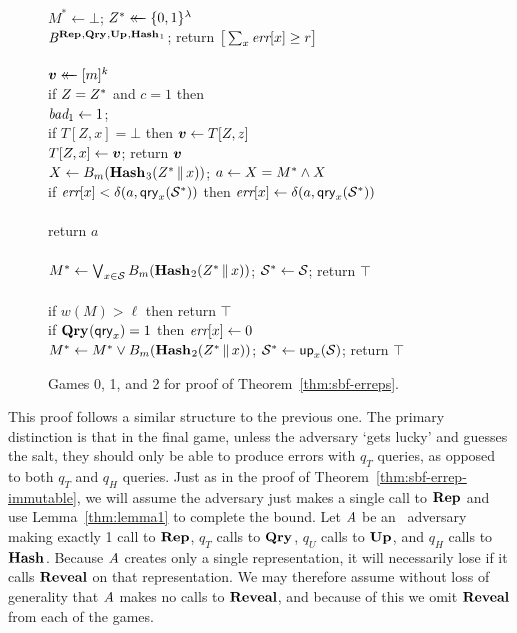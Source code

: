 \begin{figure*}
{
  \vspace{-7pt}
  \\[2pt]
    $M^* \gets \bot$;
    $Z^* \mathrel{\leftarrow\mkern-14mu\leftarrow} \{0,1\}^\lambda$\\
    $\mathit{B}^{\textup{\textbf{Rep}}\hspace{0.5pt},\textup{\textbf{Qry}}\hspace{0.5pt},\textup{\textbf{Up}}\hspace{0.5pt},\textup{\textbf{Hash}}\hspace{0.5pt}_1}$;
    return $\big[\sum_x \textit{err}[x] \geq r\big]$
  \\[6pt]
  \hfill {}\\[2pt]
    $\boldsymbol{v} \mathrel{\leftarrow\mkern-14mu\leftarrow} [m]^k$\\
    if $Z=Z^*$ and $c = 1$ then \\
    \tab $\textit{bad}_1 \gets 1$; \\
    if $T[Z,x] = \bot$ then $\boldsymbol{v} \gets T[Z,z]$\\
    $T[Z,x] \gets \boldsymbol{v}$; return $\boldsymbol{v}$
}
{
  \hfill {}\\[2pt]
    $X \gets {B}_m(\textup{\textbf{Hash}}\hspace{0.5pt}_3(Z^* \, \| \, x))$;
    $a \gets X = M^* \wedge X$\\
    if $\textit{err}[x] < \delta(a,\mathsf{qry}_x(\mathcal{S}^*))$ then
          $\textit{err}[x] \gets \delta(a,\mathsf{qry}_x(\mathcal{S}^*))$\\
    \\
    return $a$
  \\[6pt]
  \oraclev{$\REPO(\col)$}\\[2pt]
    $M^* \gets \bigvee_{x \in \mathcal{S}} {B}_m(\textup{\textbf{Hash}}\hspace{0.5pt}_2(Z^* \, \| \, x))$;
    $\mathcal{S}^* \gets \mathcal{S}$;
    return $\top$
  \\[6pt]
  \\[2pt]
    if $w(M) > \ell$ then return $\top$\\
    if $\textup{\textbf{Qry}}\hspace{0.5pt}(\mathsf{qry}_x) = 1$ then $\textit{err}[x] \gets 0$\\
    $M^* \gets M^* \vee {B}_m(\textup{\textbf{Hash}}\hspace{0.5pt}_2(Z^* \, \| \, x))$;
    $\mathcal{S}^* \gets \mathsf{up}_x(\mathcal{S})$;
    return $\top$
}
\caption{Games 0, 1, and 2 for proof of Theorem~\ref{thm:sbf-erreps}.}
\label{fig:sbf-errep-immutable/games}
\end{figure*}

This proof follows a similar structure to the previous one. The primary distinction is that in the final game, unless the adversary `gets lucky' and guesses the salt, they should only be able to produce errors with $q_T$ queries, as opposed to both $q_T$ and $q_H$ queries.
%
Just as in the proof of Theorem~\ref{thm:sbf-errep-immutable}, we will assume the adversary just makes a single call to $\textup{\textbf{Rep}}\hspace{0.5pt}$ and use Lemma~\ref{thm:lemma1} to complete the bound. Let $\mathit{A}$ be an \erreps\ adversary making exactly 1 call to $\textup{\textbf{Rep}}\hspace{0.5pt}$, $q_T$ calls to $\textup{\textbf{Qry}}\hspace{0.5pt}$, $q_U$ calls to $\textup{\textbf{Up}}\hspace{0.5pt}$, and $q_H$ calls to $\textup{\textbf{Hash}}\hspace{0.5pt}$. Because $\mathit{A}$ creates only a single representation, it will necessarily lose if it calls $\mathbf{Reveal}$ on that representation. We may therefore assume without loss of generality that $\mathit{A}$ makes no calls to $\mathbf{Reveal}$, and because of this we omit $\mathbf{Reveal}$ from each of the games.


